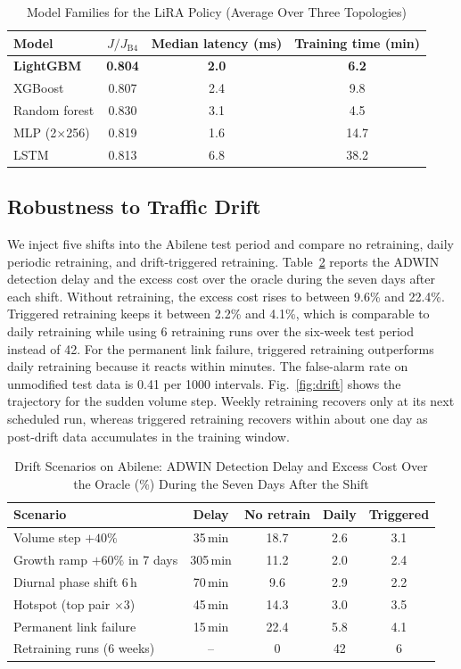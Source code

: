 \documentclass[journal]{IEEEtran}
\begin{document}
\begin{table}[t]
\centering
\caption{Model Families for the LiRA Policy (Average Over Three Topologies)}
\label{tab:models}
\footnotesize
\setlength{\tabcolsep}{4pt}
\begin{tabular}{@{}lccc@{}}
\toprule
Model & $J/J_{\mathrm{B4}}$ & Median latency (ms) & Training time (min) \\
\midrule
\textbf{LightGBM} & \textbf{0.804} & \textbf{2.0} & \textbf{6.2} \\
XGBoost & 0.807 & 2.4 & 9.8 \\
Random forest & 0.830 & 3.1 & 4.5 \\
MLP (2$\times$256) & 0.819 & 1.6 & 14.7 \\
LSTM & 0.813 & 6.8 & 38.2 \\
\bottomrule
\end{tabular}
\end{table}

\subsection{Robustness to Traffic Drift}

We inject five shifts into the Abilene test period and compare no retraining, daily periodic retraining, and drift-triggered retraining. Table~\ref{tab:drift} reports the ADWIN detection delay and the excess cost over the oracle during the seven days after each shift. Without retraining, the excess cost rises to between 9.6\% and 22.4\%. Triggered retraining keeps it between 2.2\% and 4.1\%, which is comparable to daily retraining while using 6 retraining runs over the six-week test period instead of 42. For the permanent link failure, triggered retraining outperforms daily retraining because it reacts within minutes. The false-alarm rate on unmodified test data is 0.41 per 1000 intervals. Fig.~\ref{fig:drift} shows the trajectory for the sudden volume step. Weekly retraining recovers only at its next scheduled run, whereas triggered retraining recovers within about one day as post-drift data accumulates in the training window.

\begin{table}[t]
\centering
\caption{Drift Scenarios on Abilene: ADWIN Detection Delay and Excess Cost Over the Oracle (\%) During the Seven Days After the Shift}
\label{tab:drift}
\footnotesize
\setlength{\tabcolsep}{3pt}
\begin{tabular}{@{}lcccc@{}}
\toprule
Scenario & Delay & No retrain & Daily & Triggered \\
\midrule
Volume step $+40\%$ & 35\,min & 18.7 & 2.6 & 3.1 \\
Growth ramp $+60\%$ in 7 days & 305\,min & 11.2 & 2.0 & 2.4 \\
Diurnal phase shift 6\,h & 70\,min & 9.6 & 2.9 & 2.2 \\
Hotspot (top pair $\times3$) & 45\,min & 14.3 & 3.0 & 3.5 \\
Permanent link failure & 15\,min & 22.4 & 5.8 & 4.1 \\
\midrule
Retraining runs (6 weeks) & -- & 0 & 42 & 6 \\
\bottomrule
\end{tabular}
\end{table}
\end{document}

